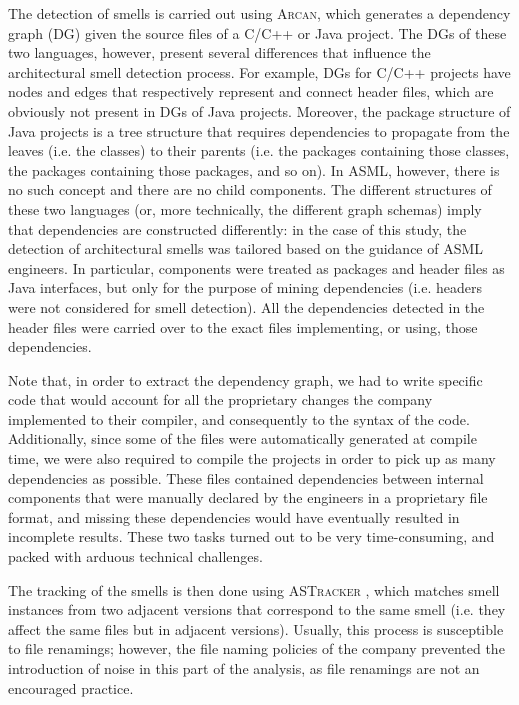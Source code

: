 The detection of smells is carried out using \textsc{Arcan}, which generates a dependency graph (DG) given the source files of a C/C++ or Java project.
The DGs of these two languages, however, present several differences that influence the architectural smell detection process.
For example, DGs for C/C++ projects have nodes and edges that respectively represent and connect header files, which are obviously not present in DGs of Java projects.
Moreover, the package structure of Java projects is a tree structure that requires dependencies to propagate from the leaves (i.e. the classes) to their parents (i.e. the packages containing those classes, the packages containing those packages, and so on).
In ASML, however, there is no such concept and there are no child components.
The different structures of these two languages (or, more technically, the different graph schemas) imply that dependencies are constructed differently: in the case of this study, the detection of architectural smells was tailored based on the guidance of ASML engineers.
In particular, components were treated as packages and header files as Java interfaces, but only for the purpose of mining dependencies (i.e. headers were not considered for smell detection).
All the dependencies detected in the header files were carried over to the exact files implementing, or using, those dependencies.

Note that, in order to extract the dependency graph, we had to write specific code that would account for all the proprietary changes the company implemented to their compiler, and consequently to the syntax of the code. 
Additionally, since some of the files were automatically generated at compile time, we were also required to compile the projects in order to pick up as many dependencies as possible. These files contained dependencies between internal components that were manually declared by the engineers in a proprietary file format, and missing these dependencies would have eventually resulted in incomplete results.
These two tasks turned out to be very time-consuming, and packed with arduous technical challenges.

The tracking of the smells is then done using \textsc{ASTracker} \cite{Sas2019}, which matches smell instances from two adjacent versions that correspond to the same smell (i.e. they affect the same files but in adjacent versions).
Usually, this process is susceptible to file renamings; however, the file naming policies of the company prevented the introduction of noise in this part of the analysis, as file renamings are not an encouraged practice.

